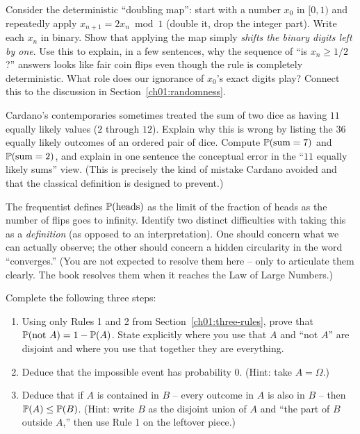 \begin{exercise}
\label{ch01:ex-doubling}
Consider the deterministic ``doubling map'': start with a number $x_0$ in $[0,1)$
and repeatedly apply $x_{n+1} = 2x_n \bmod 1$ (double it, drop the integer part).
Write each $x_n$ in binary. Show that applying the map simply \emph{shifts the
binary digits left by one}. Use this to explain, in a few sentences, why the
sequence of ``is $x_n \ge 1/2$?'' answers looks like fair coin flips even though the
rule is completely deterministic. What role does our ignorance of $x_0$'s exact
digits play? Connect this to the discussion in Section~\ref{ch01:randomness}.
\end{exercise}

\begin{exercise}
\label{ch01:ex-two-dice}
Cardano's contemporaries sometimes treated the sum of two dice as having $11$
equally likely values ($2$ through $12$). Explain why this is wrong by listing the
$36$ equally likely outcomes of an ordered pair of dice. Compute $\P(\text{sum}=7)$
and $\P(\text{sum}=2)$, and explain in one sentence the conceptual error in the
``$11$ equally likely sums'' view. (This is precisely the kind of mistake Cardano
avoided and that the classical definition is designed to prevent.)
\end{exercise}

\begin{exercise}
\label{ch01:ex-infinity}
The frequentist defines $\P(\text{heads})$ as the limit of the fraction of heads as
the number of flips goes to infinity. Identify two distinct difficulties with
taking this as a \emph{definition} (as opposed to an interpretation). One should
concern what we can actually observe; the other should concern a hidden circularity
in the word ``converges.'' (You are not expected to resolve them here -- only to
articulate them clearly. The book resolves them when it reaches the Law of Large
Numbers.)
\end{exercise}

\begin{exercise}
\label{ch01:ex-proof}
Complete the following three steps:
\begin{enumerate}
\item Using only Rules 1 and 2 from Section~\ref{ch01:three-rules}, prove that
$\P(\text{not } A) = 1 - \P(A)$. State explicitly where you use that $A$ and
``not $A$'' are disjoint and where you use that together they are everything.
\item Deduce that the impossible event has probability $0$. (Hint: take $A = \Omega$.)
\item Deduce that if $A$ is contained in $B$ -- every outcome in $A$ is also in $B$
-- then $\P(A) \le \P(B)$. (Hint: write $B$ as the disjoint union of $A$ and ``the
part of $B$ outside $A$,'' then use Rule 1 on the leftover piece.)
\end{enumerate}
\end{exercise}
